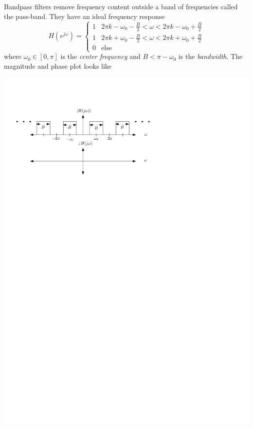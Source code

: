 Bandpass filters remove frequency content outside a band of frequencies called the pass-band. They have an ideal frequency response
\[
H\left(e^{j\omega}\right) = \left\{ \begin{array}{lc}
  1 & 2\pi k -\omega_0 - \frac{B}{2} < \omega < 2\pi k -\omega_0+\frac{B}{2}\\[1em]
  1 & 2\pi k + \omega_0 -\frac{B}{2} < \omega < 2\pi k + \omega_0+\frac{B}{2}\\[1em]
  0 & \text{else}
\end{array}
\right. 
\]
where $\omega_0\in [0,\pi]$ is the \emph{center frequency} and $B < \pi - \omega_0$ is the \emph{bandwidth}. The magnitude and phase plot looks like
\begin{center}
  \includegraphics[scale=1]{graphics/bandpass-ideal-dt.pdf}
\end{center}

